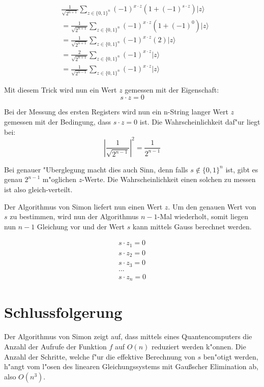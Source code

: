 \begin{refsection}
\begin{align*}
    &\frac1{\sqrt{2^{n + 1}}}
      \sum_{z \in \{0,1\}^n}  { (-1)^{x \cdot z} ( 1 + (-1)^{ s \cdot z}) |z\rangle } 
    \\
    &= 
    \frac1{\sqrt{2^{n + 1}}}
      \sum_{z \in \{0,1\}^n}  { (-1)^{x \cdot z} ( 1 + (-1)^0) |z\rangle } 
    \\
    &= 
    \frac1{\sqrt{2^{n + 1}}}
      \sum_{z \in \{0,1\}^n}  { (-1)^{x \cdot z} (2) |z\rangle } 
    \\
    &= 
    \frac{2}{\sqrt{2^{n + 1}}} 
      \sum_{z \in \{0,1\}^n}  { (-1)^{x \cdot z}|z\rangle } 
    \\
    &= 
    \frac1{\sqrt{2^{n - 1}}} 
      \sum_{z \in \{0,1\}^n}  { (-1)^{x \cdot z}|z\rangle } 
\end{align*}

Mit diesem Trick wird nun ein Wert $z$ gemessen mit der Eigenschaft:
\[
    s \cdot z = 0
\]

Bei der Messung des ersten Registers wird nun ein n-String langer Wert $z$
gemessen mit der Bedingung, dass $s \cdot z = 0$ ist. Die Wahrscheinlichkeit
daf"ur liegt bei:
\[
    |\frac1{\sqrt{2^{n - 1}}}|^2 = \frac1{2^{n-1}} 
\]

Bei genauer "Uberglegung macht dies auch Sinn, denn falls $s \notin \{0,1\}^n$
ist, gibt es genau $2^{n-1}$ m"oglichen $z$-Werte. Die Wahrscheinlichkeit einen
solchen zu messen ist also gleich-verteilt.

Der Algorithmus von Simon liefert nun einen Wert $z$. Um den genauen Wert von
$s$ zu bestimmen, wird nun der Algorithmus $n-1$-Mal wiederholt, somit liegen
nun $n-1$ Gleichung vor und der Wert $s$ kann mittels Gauss berechnet werden.

\begin{align*}
    s \cdot z_{1} = 0
    \\
    s \cdot z_{2} = 0
    \\
    s \cdot z_{3} = 0
    \\
    ...
    \\
    s \cdot z_{n} = 0
\end{align*}


\section{Schlussfolgerung}


Der Algorithmus von Simon zeigt auf, dass mittels eines Quantencomputers die
Anzahl der Aufrufe der Funktion $f$ auf $O(n)$ reduziert werden k"onnen. Die
Anzahl der Schritte, welche f"ur die effektive Berechnung von $s$ ben"otigt
werden, h"angt vom l"osen des linearen Gleichungssystems mit Gaußscher
Elimination ab, also $O(n^3)$.


\printbibliography[heading=subbibliography] \end{refsection}


